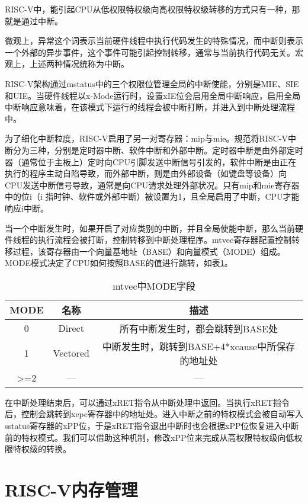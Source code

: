 RISC-V中，能引起CPU从低权限特权级向高权限特权级转移的方式只有一种，那就是通过中断。

微观上，异常这个词表示当前硬件线程中执行代码发生的特殊情况，而中断则表示一个外部的异步事件，这个事件可能引起控制转移，通常与当前执行代码无关。宏观上，上述两种情况统称为中断。

RISC-V架构通过mstatus中的三个权限位管理全局的中断使能，分别是MIE、SIE和UIE。当硬件线程以x-Mode运行时，设置xIE位会启用全局中断响应，启用全局中断响应意味着，在该模式下运行的线程会被中断打断，并进入到中断处理流程中。

为了细化中断粒度，RISC-V启用了另一对寄存器：mip与mie。规范将RISC-V中断分为三种，分别是定时器中断、软件中断和外部中断。定时器中断是由外部定时器（通常位于主板上）定时向CPU引脚发送中断信号引发的，软件中断是由正在执行的程序主动自陷导致，而外部中断，则是由外部设备（如键盘等设备）向CPU发送中断信号导致，通常是向CPU请求处理外部状况。只有mip和mie寄存器中的位i（i 指时钟、软件或外部中断）被设置为1，且全局启用了中断，CPU才能响应i中断。

当一个中断发生时，如果开启了对应类别的中断，并且全局使能中断，那么当前硬件线程的执行流程会被打断，控制转移到中断处理程序。mtvec寄存器配置控制转移过程，该寄存器由一个向量基地址（BASE）和向量模式（MODE）组成。MODE模式决定了CPU如何按照BASE的值进行跳转，如表\ref{tab:mtvec}。

\begin{table}[h]
	\centering
	\setlength{\belowcaptionskip}{2pt}
	\caption{mtvec中MODE字段}
	\label{tab:mtvec}
	\begin{tabular}{ccc}
		\hline
		MODE             & 名称       & 描述                                        \\ \hline
		0                & Direct   & 所有中断发生时，都会跳转到BASE处                        \\
		1                & Vectored & 中断发生时，跳转到BASE+4*xcause中所保存的地址处 \\
		\textgreater{}=2 & —        & —                                         \\ \hline
	\end{tabular}
\end{table}

在中断处理结束后，可以通过xRET指令从中断处理中返回。当执行xRET指令后，控制会跳转到xepc寄存器中的地址处。进入中断之前的特权模式会被自动写入 sstatus寄存器的xPP位，于是xRET指令退出中断时也会根据xPP位恢复进入中断前的特权模式。我们可以借助这种机制，修改xPP位来完成从高权限特权级向低权限特权级的转换。

\section{RISC-V内存管理}

